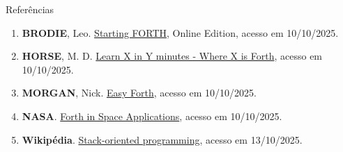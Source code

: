 \begin{frame}[fragile]{Referências}

    \begin{enumerate}
        \item \textbf{BRODIE}, Leo. \href{https://www.forth.com/starting-forth/}{Starting FORTH}, Online Edition, acesso em 10/10/2025.

        \item \textbf{HORSE}, M. D. \href{https://learnxinyminutes.com/forth/}{Learn X in Y minutes - Where X is Forth}, acesso em 10/10/2025.

        \item \textbf{MORGAN}, Nick. \href{https://skilldrick.github.io/easyforth/#introduction}{Easy Forth}, acesso em 10/10/2025.

        \item \textbf{NASA}. \href{https://www.forth.com/resources/space-applications/}{Forth in Space Applications}, acesso em 10/10/2025.

        \item \textbf{Wikipédia}. \href{https://en.wikipedia.org/wiki/Stack-oriented_programming}{Stack-oriented programming}, acesso em 13/10/2025.

    \end{enumerate}

\end{frame}
